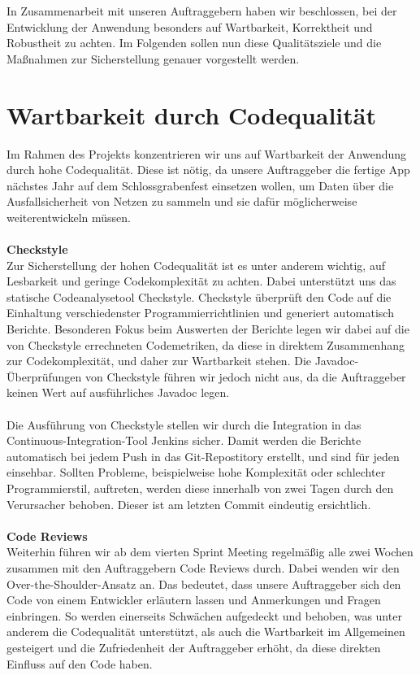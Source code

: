 
  In Zusammenarbeit mit unseren Auftraggebern haben wir beschlossen, bei der Entwicklung der Anwendung besonders auf Wartbarkeit, Korrektheit und Robustheit zu achten. Im Folgenden sollen nun diese Qualitätsziele und die Maßnahmen zur Sicherstellung genauer vorgestellt werden.

  \section{Wartbarkeit durch Codequalität}
    Im Rahmen des Projekts konzentrieren wir uns auf Wartbarkeit der Anwendung durch hohe Codequalität. Diese ist nötig, da unsere Auftraggeber die fertige App nächstes Jahr auf dem Schlossgrabenfest einsetzen wollen, um Daten über die Ausfallsicherheit von Netzen zu sammeln und sie dafür möglicherweise weiterentwickeln müssen.\\\\
    \textbf{Checkstyle}\\
    Zur Sicherstellung der hohen Codequalität ist es unter anderem wichtig, auf Lesbarkeit und geringe Codekomplexität zu achten. Dabei unterstützt uns das statische Codeanalysetool Checkstyle. Checkstyle überprüft den Code auf die Einhaltung verschiedenster Programmierrichtlinien und generiert automatisch Berichte. Besonderen Fokus beim Auswerten der Berichte legen wir dabei auf die von Checkstyle errechneten Codemetriken, da diese in direktem Zusammenhang zur Codekomplexität, und daher zur Wartbarkeit stehen. Die Javadoc-Überprüfungen von Checkstyle führen wir jedoch nicht aus, da die Auftraggeber keinen Wert auf ausführliches Javadoc legen.\\\\
    Die Ausführung von Checkstyle stellen wir durch die Integration in das Continuous-Integration-Tool Jenkins sicher. Damit werden die Berichte automatisch bei jedem Push in das Git-Repostitory erstellt, und sind für jeden einsehbar. Sollten Probleme, beispielweise hohe Komplexität oder schlechter Programmierstil, auftreten, werden diese innerhalb von zwei Tagen durch den Verursacher behoben. Dieser ist am letzten Commit eindeutig ersichtlich.\\\\
    \textbf{Code Reviews}\\
    Weiterhin führen wir ab dem vierten Sprint Meeting regelmäßig alle zwei Wochen zusammen mit den Auftraggebern Code Reviews durch. Dabei wenden wir den Over-the-Shoulder-Ansatz an. Das bedeutet, dass unsere Auftraggeber sich den Code von einem Entwickler erläutern lassen und Anmerkungen und Fragen einbringen. So werden einerseits Schwächen aufgedeckt und behoben, was unter anderem die Codequalität unterstützt, als auch die Wartbarkeit im Allgemeinen gesteigert und die Zufriedenheit der Auftraggeber erhöht, da diese direkten Einfluss auf den Code haben.\\\\
